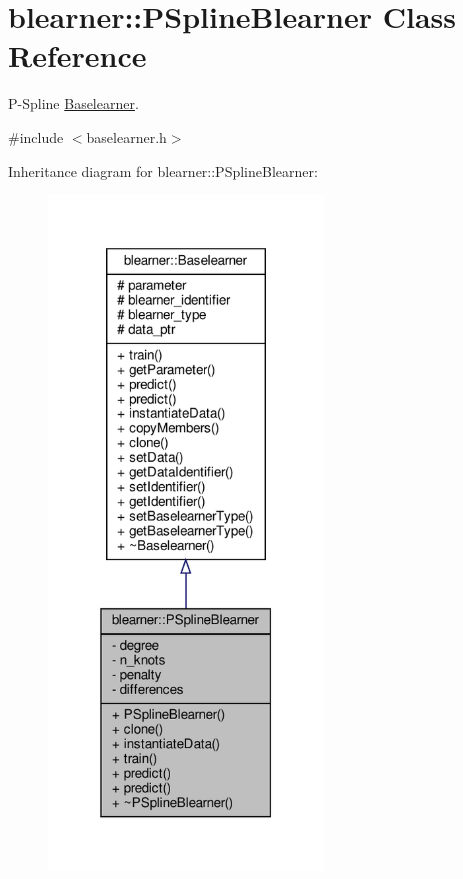 \hypertarget{classblearner_1_1_p_spline_blearner}{}\section{blearner\+:\+:P\+Spline\+Blearner Class Reference}
\label{classblearner_1_1_p_spline_blearner}


P-\/\+Spline \hyperlink{classblearner_1_1_baselearner}{Baselearner}.  




{\ttfamily \#include $<$baselearner.\+h$>$}



Inheritance diagram for blearner\+:\+:P\+Spline\+Blearner\+:
\nopagebreak
\begin{figure}[H]
\begin{center}
\leavevmode
\includegraphics[width=207pt]{classblearner_1_1_p_spline_blearner__inherit__graph}
\end{center}
\end{figure}


